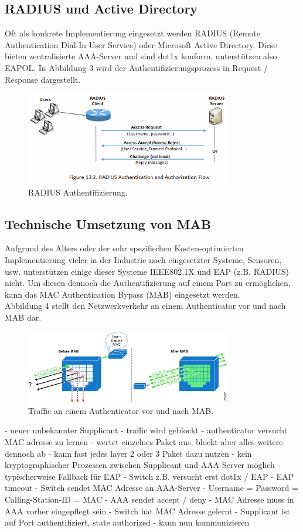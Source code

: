 \documentclass[conference]{IEEEtran}
\begin{document}
\subsection{RADIUS und Active Directory}
Oft als konkrete Implementierung eingesetzt werden RADIUS (Remote Authentication Dial-In User Service) oder Microsoft Active Directory. Diese bieten zentralisierte AAA-Server und sind dot1x konform, unterstützen also EAPOL. In Abbildung 3 wird der Authentifizierungsprozess in Request / Response dargestellt.

\begin{figure}[hbt]
	\centering
	\includegraphics[width=9cm]{figures/radius}
	\caption{RADIUS Authentifizierung.}
\end{figure}

\subsection{Technische Umsetzung von MAB}
Aufgrund des Alters oder der sehr spezifischen Kosten-optimierten Implementierung vieler in der Industrie noch eingesetzter Systeme, Sensoren, usw. unterstützen einige dieser Systeme IEEE802.1X und EAP (z.B. RADIUS) nicht. Um diesen dennoch die Authentifizierung auf einem Port zu ermöglichen, kann das MAC Authentication Bypass (MAB) eingesetzt werden.\\
Abbildung 4 stellt den Netzwerkverkehr an einem Authenticator vor und nach MAB dar.

\begin{figure}[hbt]
	\centering
	\includegraphics[width=9cm]{figures/mab-before-after}
	\caption{Traffic an einem Authenticator vor und nach MAB.}
\end{figure}

- neuer unbekannter Supplicant
- traffic wird geblockt
- authenticator versucht MAC adresse zu lernen
- wertet einzelnes Paket aus, blockt aber alles weitere dennoch ab
- kann fast jedes layer 2 oder 3 Paket dazu nutzen
- kein kryptographischer Prozessen zwischen Supplicant und AAA Server möglich
- typischerweise Fallback für EAP
- Switch z.B. versucht erst dot1x / EAP
- EAP timeout
- Switch sendet MAC Adresse an AAA-Server
- Username = Password = Calling-Station-ID = MAC
- AAA sendet accept / deny
- MAC Adresse muss in AAA vorher eingepflegt sein
- Switch hat MAC Adresse gelernt
- Supplicant ist auf Port authentifiziert, state authorized
- kann nun kommunizieren
\end{document}
